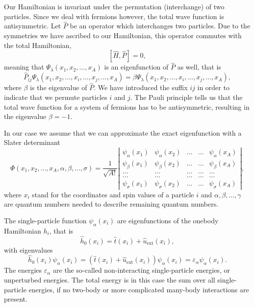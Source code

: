 \documentclass[%
twoside,                 %
final,                   %
10pt]{article}
\begin{document}
Our Hamiltonian is invariant under the permutation (interchange) of two particles.
Since we deal with fermions however, the total wave function is antisymmetric.
Let $\hat{P}$ be an operator which interchanges two particles.
Due to the symmetries we have ascribed to our Hamiltonian, this operator commutes with the total Hamiltonian,
\[
[\hat{H},\hat{P}] = 0,
 \]
meaning that $\Psi_{\lambda}(x_1, x_2, \dots , x_A)$ is an eigenfunction of 
$\hat{P}$ as well, that is
\[
\hat{P}_{ij}\Psi_{\lambda}(x_1, x_2, \dots,x_i,\dots,x_j,\dots,x_A)=
\beta\Psi_{\lambda}(x_1, x_2, \dots,x_i,\dots,x_j,\dots,x_A),
\]
where $\beta$ is the eigenvalue of $\hat{P}$. We have introduced the suffix $ij$ in order to indicate that we permute particles $i$ and $j$.
The Pauli principle tells us that the total wave function for a system of fermions
has to be antisymmetric, resulting in the eigenvalue $\beta = -1$.   



In our case we assume that  we can approximate the exact eigenfunction with a Slater determinant
\begin{equation}
   \Phi(x_1, x_2,\dots ,x_A,\alpha,\beta,\dots, \sigma)=\frac{1}{\sqrt{A!}}
\left| \begin{array}{ccccc} \psi_{\alpha}(x_1)& \psi_{\alpha}(x_2)& \dots & \dots & \psi_{\alpha}(x_A)\\
                            \psi_{\beta}(x_1)&\psi_{\beta}(x_2)& \dots & \dots & \psi_{\beta}(x_A)\\  
                            \dots & \dots & \dots & \dots & \dots \\
                            \dots & \dots & \dots & \dots & \dots \\
                     \psi_{\sigma}(x_1)&\psi_{\sigma}(x_2)& \dots & \dots & \psi_{\sigma}(x_A)\end{array} \right|, \label{eq:HartreeFockDet}
\end{equation}
where  $x_i$  stand for the coordinates and spin values of a particle $i$ and $\alpha,\beta,\dots, \gamma$ 
are quantum numbers needed to describe remaining quantum numbers.  




The single-particle function $\psi_{\alpha}(x_i)$  are eigenfunctions of the onebody
Hamiltonian $h_i$, that is
\[
\hat{h}_0(x_i)=\hat{t}(x_i) + \hat{u}_{\mathrm{ext}}(x_i),
\]
with eigenvalues 
\[
\hat{h}_0(x_i) \psi_{\alpha}(x_i)=\left(\hat{t}(x_i) + \hat{u}_{\mathrm{ext}}(x_i)\right)\psi_{\alpha}(x_i)=\varepsilon_{\alpha}\psi_{\alpha}(x_i).
\]
The energies $\varepsilon_{\alpha}$ are the so-called non-interacting single-particle energies, or unperturbed energies. 
The total energy is in this case the sum over all  single-particle energies, if no two-body or more complicated
many-body interactions are present.
\end{document}
